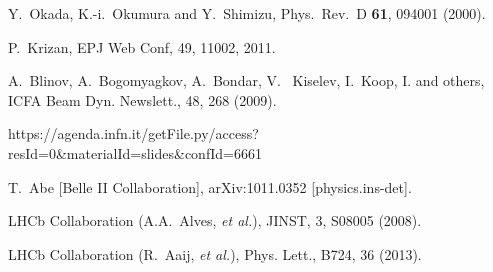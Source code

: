 \begin{thebibliography}{99}
 
    Y.~Okada, K.-i.~Okumura and Y.~Shimizu, Phys.\ Rev.\ D {\bf 61}, 094001 (2000).
 
%
%
P.~Krizan, EPJ Web Conf, 49, 11002, 2011.

A.~Blinov, A.~Bogomyagkov, A.~Bondar, V.~ Kiselev, I.~Koop, I. and others,
ICFA Beam Dyn. Newslett., 48, 268 (2009).

{\small https://agenda.infn.it/getFile.py/access?resId=0\&materialId=slides\&confId=6661}

  T.~Abe [Belle II Collaboration],
  arXiv:1011.0352 [physics.ins-det].

LHCb Collaboration (A.A.~Alves, {\it et al.}),
JINST, 3, S08005 (2008).


LHCb Collaboration (R.~Aaij, {\it et al.}),
Phys. Lett., B724, 36 (2013).


\end{thebibliography}
